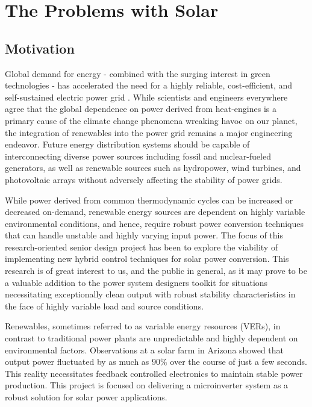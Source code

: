 
\chapter{The Problems with Solar} %

\label{Chapter1} %



\section{Motivation}
Global demand for energy - combined with the surging interest in green technologies - has accelerated the need for a highly reliable, cost-efficient, and self-sustained electric power grid \cite{futureGrid}. While scientists and engineers everywhere agree that the global dependence on power derived from heat-engines is a primary cause of the climate change phenomena wreaking havoc on our planet, the integration of renewables into the power grid remains a major engineering endeavor. Future energy distribution systems should be capable of interconnecting diverse power sources including fossil and nuclear-fueled generators, as well as renewable sources such as hydropower, wind turbines, and photovoltaic arrays without adversely affecting the stability of power grids. 

While power derived from common thermodynamic cycles can be increased or decreased on-demand, renewable energy sources are dependent on highly variable environmental conditions, and hence, require robust power conversion techniques that can handle unstable and highly varying input power\cite{ricardo}. The focus of this research-oriented senior design project has been to explore the viability of implementing new hybrid control techniques for solar power conversion. This research is of great interest to us, and the public in general, as it may prove to be a valuable addition to the power system designers toolkit for situations necessitating exceptionally clean output with robust stability characteristics in the face of highly variable load and source conditions.

Renewables, sometimes referred to as variable energy resources (VERs), in contrast to traditional power plants are unpredictable and highly dependent on environmental factors. Observations at a solar farm in Arizona showed that output power fluctuated by as much as $90\%$ over the course of just a few seconds. This reality necessitates feedback controlled electronics to maintain stable power production. This project is focused on delivering a microinverter system as a robust solution for solar power applications.

